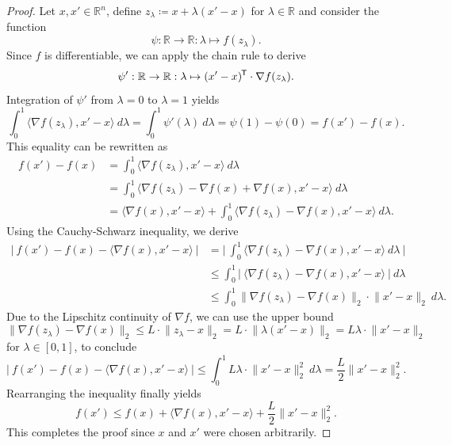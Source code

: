 \documentclass[11pt, a4paper]{article}
\newcommand{\R}{\mathbb{R}}
\newcommand*{\tr}{^{\mkern-1.5mu\mathsf{T}}}
\begin{document}
\begin{proof}
Let $x,x' \in \R^n$, define $z_{\lambda} \coloneq x + \lambda (x' - x)$ for $\lambda \in \R$ and consider the function
\[ \psi : \R \to \R : \lambda \mapsto f(z_{\lambda}). \]
Since $f$ is differentiable, we can apply the chain rule to derive
\[ \psi' : \R \to \R : \lambda \mapsto (x'-x)\tr \cdot \nabla f(z_\lambda) . \]
Integration of $\psi'$ from $\lambda = 0$ to $\lambda = 1$ yields
\[ \int_{0}^{1} \big \langle \nabla f(z_{\lambda}), x'-x \big \rangle \ d\lambda = \int_{0}^{1} \psi'(\lambda) \ d \lambda = \psi(1) - \psi(0) = f(x') - f(x). \]
This equality can be rewritten as
\[ \begin{split} 
f(x') - f(x) 
&= \int_{0}^{1}\big \langle \nabla f(z_{\lambda}), x'-x \big \rangle \ d\lambda \\\
&= \int_{0}^{1} \big \langle \nabla f(z_{\lambda}) - \nabla f(x) + \nabla f(x) , x'-x\big \rangle \ d\lambda \\\
&= \big \langle \nabla f(x), x'-x \big \rangle + \int_{0}^{1} \big \langle \nabla f(z_{\lambda}) - \nabla f(x), x'-x \big \rangle \ d\lambda.
\end{split} \]
Using the Cauchy-Schwarz inequality, we derive
\[ \begin{split}
\Big | \ f(x') - f(x) - \big \langle \nabla f(x), x'-x \big \rangle \ \Big | 
&= \Big | \ \int_{0}^{1} \big \langle \nabla f(z_{\lambda}) - \nabla f(x), x'-x \big \rangle \ d\lambda \ \Big | \\\
&\leq \int_{0}^{1} \Big | \ \big \langle \nabla f(z_{\lambda}) - \nabla f(x), x'-x \big \rangle \ \Big | \ d\lambda \\\
&\leq \int_{0}^{1} \big \| \nabla f( z_{\lambda}) - \nabla f(x) \big \|_2 \cdot \big \| x'-x \big \|_2 \ d\lambda.
\end{split} \]
Due to the Lipschitz continuity of $\nabla f$, we can use the upper bound 
\[ \big \| \nabla f( z_{\lambda}) - \nabla f(x) \big \|_2 \leq L \cdot \big \| z_{\lambda} - x \big \|_2 = L \cdot \big \| \lambda(x'-x) \big \|_2 = L\lambda \cdot \big \| x'-x \big \|_2 \]
for $\lambda \in [0,1]$, to conclude
\[ \Big | \ f(x') - f(x) - \big \langle \nabla f(x), x'-x \big \rangle \ \Big | \leq \int_{0}^{1} L\lambda \cdot \big \| x'-x \big \|_2^2 \ d\lambda = \frac{L}{2} \big \| x'-x \big \|_2^2. \]
Rearranging the inequality finally yields
\[ f(x') \leq f(x) + \big \langle \nabla f(x) , x' -x \big \rangle + \frac{L}{2} \big \| x' - x \big \|_2^2. \]
This completes the proof since $x$ and $x'$ were chosen arbitrarily.
\end{proof}
\end{document}
